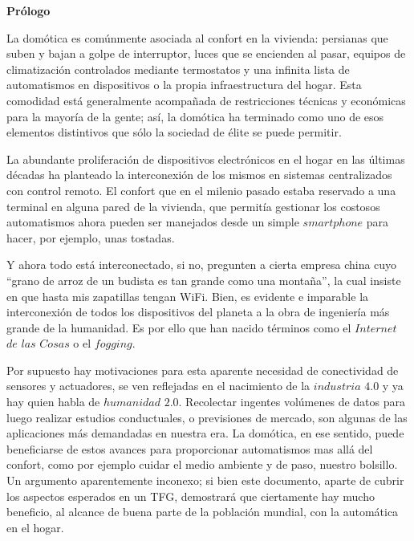 
\newpage

\thispagestyle{empty}
\begin{center}

{\bf \Huge Prólogo}
\end{center}
\vspace{1cm}


La domótica es comúnmente asociada al confort en la vivienda: persianas que suben y bajan a golpe de interruptor, luces que se encienden al pasar, equipos de climatización controlados mediante termostatos y una infinita lista de automatismos en dispositivos o la propia infraestructura del hogar. Esta comodidad está generalmente acompañada de restricciones técnicas y económicas para la mayoría de la gente; así, la domótica ha terminado como uno de esos elementos distintivos que sólo la sociedad de élite se puede permitir.

La abundante proliferación de dispositivos electrónicos en el hogar en las últimas décadas ha planteado la interconexión de los mismos en sistemas centralizados con control remoto. El confort que en el milenio pasado estaba reservado a una terminal en alguna pared de la vivienda, que permitía gestionar los costosos automatismos ahora pueden ser manejados desde un simple $smartphone$ para hacer, por ejemplo, unas tostadas.

Y ahora todo está interconectado, si no, pregunten a cierta empresa china cuyo “grano de arroz de un budista es tan grande como una montaña”, la cual insiste en que hasta mis zapatillas tengan WiFi. Bien, es evidente e imparable la interconexión de todos los dispositivos del planeta a la obra de ingeniería más grande de la humanidad. Es por ello que han nacido términos como el $Internet$ $de$ $las$ $Cosas$ o el $fogging$.

Por supuesto hay motivaciones para esta aparente necesidad de conectividad de sensores y actuadores, se ven reflejadas en el nacimiento de la $industria$ $4{.}0$ y ya hay quien habla de $humanidad$ $2{.}0$. Recolectar ingentes volúmenes de datos para luego realizar estudios conductuales, o previsiones de mercado, son algunas de las aplicaciones más demandadas en nuestra era. La domótica, en ese sentido, puede beneficiarse de estos avances para proporcionar automatismos mas allá del confort, como por ejemplo cuidar el medio ambiente y de paso, nuestro bolsillo. Un argumento aparentemente inconexo; si bien este documento, aparte de cubrir los aspectos esperados en un TFG, demostrará que ciertamente hay mucho beneficio, al alcance de buena parte de la población mundial, con la automática en el hogar.
